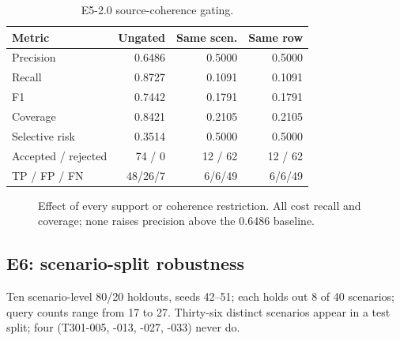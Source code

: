 \documentclass[10pt,twocolumn,a4paper]{extarticle}
\begin{document}
\begin{table}[t]
\centering
\caption{E5-2.0 source-coherence gating.}
\label{tab:e5}
\begin{tabular}{@{}l rrr@{}}
\toprule
\textbf{Metric} & \textbf{Ungated} & \textbf{Same scen.} & \textbf{Same row}\\
\midrule
Precision & 0.6486 & 0.5000 & 0.5000\\
Recall & 0.8727 & 0.1091 & 0.1091\\
F1 & 0.7442 & 0.1791 & 0.1791\\
Coverage & 0.8421 & 0.2105 & 0.2105\\
Selective risk & 0.3514 & 0.5000 & 0.5000\\
Accepted / rejected & 74 / 0 & 12 / 62 & 12 / 62\\
TP / FP / FN & 48/26/7 & 6/6/49 & 6/6/49\\
\bottomrule
\end{tabular}
\end{table}

\begin{figure}[t]
\centering
{}
\caption{Effect of every support or coherence restriction. All cost recall and coverage; none raises precision above the 0.6486 baseline.}
\label{fig:filters}
\end{figure}

\subsection{E6: scenario-split robustness}
Ten scenario-level 80/20 holdouts, seeds 42--51; each holds out 8 of 40 scenarios; query counts range from 17 to 27. Thirty-six distinct scenarios appear in a test split; four (T301-005, -013, -027, -033) never do.
\end{document}
